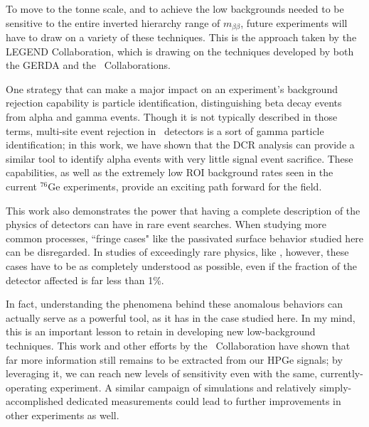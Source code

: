 To move to the tonne scale, and to achieve the low backgrounds needed to be sensitive to the entire inverted hierarchy range of $m_{\beta\beta}$, future experiments will have to draw on a variety of these techniques. This is the approach taken by the LEGEND Collaboration, which is drawing on the techniques developed by both the GERDA and the \MJ\ Collaborations. 

One strategy that can make a major impact on an experiment's background rejection capability is particle identification, distinguishing beta decay events from alpha and gamma events. Though it is not typically described in those terms, multi-site event rejection in \ppc\ detectors is a sort of gamma particle identification; in this work, we have shown that the DCR analysis can provide a similar tool to identify alpha events with very little signal event sacrifice. These capabilities, as well as the extremely low ROI background rates seen in the current $^{76}$Ge experiments, provide an exciting path forward for the field. 

This work also demonstrates the power that having a complete description of the physics of detectors can have in rare event searches. When studying more common processes, ``fringe cases" like the passivated surface behavior studied here can be disregarded. In studies of exceedingly rare physics, like \nonubb, however, these cases have to be as completely understood as possible, even if the fraction of the detector affected is far less than 1\%. 

In fact, understanding the phenomena behind these anomalous behaviors can actually serve as a powerful tool, as it has in the case studied here. In my mind, this is an important lesson to retain in developing new low-background techniques. This work and other efforts by the \MJ\ Collaboration have shown that far more information still remains to be extracted from our HPGe signals; by leveraging it, we can reach new levels of sensitivity even with the same, currently-operating experiment. A similar campaign of simulations and relatively simply-accomplished dedicated measurements could lead to further improvements in other experiments as well. 



